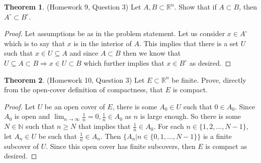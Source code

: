 \documentclass{article}
\theoremstyle{definition}
\newtheorem{theorem}{Theorem}
\newcommand{\N}{\mathbb{N}}
\newcommand{\R}{\mathbb{R}}
\begin{document}
\pagebreak
\begin{theorem}
(Homework 9, Question 3) Let $A, B \subset \R^n$. Show that if $A \subset B$, then $A^\circ \subset B^\circ$. 
\end{theorem}

\begin{proof}
Let assumptions be as in the problem statement. Let us consider $x \in A^\circ$ which is to say that $x$ is in the interior of $A$. This implies that there is a set $U$ such that $x\in U \subseteq A$ and since $A \subset B$ then we know that $U\subseteq A \subset B \Rightarrow x\in U\subset B$ which further implies that $x\in B^\circ$ as desired.
\end{proof}

\pagebreak
\begin{theorem}
(Homework 10, Question 3) Let $E \subset \R^n$ be finite. Prove, directly from the open-cover definition of compactness, that $E$ is compact. 
\end{theorem}

\begin{proof}
Let $U$ be an open cover of $E$, there is some $A_0\in U$ such that $0\in A_0$. Since $A_0$ is open and $\lim_{n\to\infty}\frac{1}{n} = 0, \frac{1}{n}\in A_0$ as $n$ is large enough. So there is some $N\in \N$ such that $n \geq N$ that implies that $\frac{1}{n}\in A_0.$ For each $n\in \{1, 2, ..., N-1\}$, let $A_n\in U$ be such that $\frac{1}{n} \in A_n$. Then $\{A_n|n \in \{0, 1, ..., N-1\}\}$ is a finite subcover of $U.$ Since this open cover has finite subcovers, then $E$ is compact as desired.
\end{proof}
\end{document}

